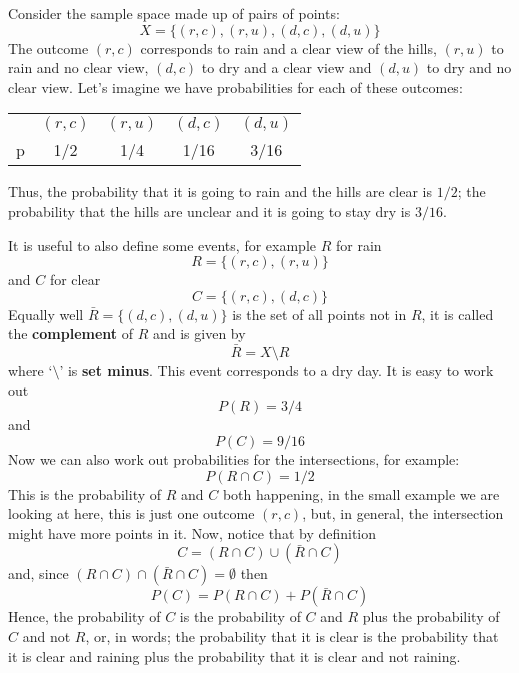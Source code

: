 \documentclass[11pt,a4paper]{scrartcl}
\begin{document}
Consider the sample space made up of pairs of points:
\begin{equation}
X=\{(r,c),(r,u),(d,c),(d,u)\}
\end{equation}
The outcome $(r,c)$ corresponds to rain and a clear view of the hills,
$(r,u)$ to rain and no clear view, $(d,c)$ to dry and a clear view and
$(d,u)$ to dry and no clear view. Let's imagine we have probabilities
for each of these outcomes:
\begin{center}
\begin{tabular}{c|cccc}
&$(r,c)$&$(r,u)$&$(d,c)$&$(d,u)$\\
p&1/2&1/4&1/16&3/16
\end{tabular}
\end{center}
Thus, the probability that it is going to rain and the hills are clear
is $1/2$; the probability that the hills are unclear and it is going
to stay dry is $3/16$. 

It is useful to also define some events, for example $R$ for rain
\begin{equation}
R=\{(r,c),(r,u)\}
\end{equation}
and $C$ for clear
\begin{equation}
C=\{(r,c),(d,c)\}
\end{equation}
Equally well $\bar{R}=\{(d,c),(d,u)\}$ is the set of all points not in $R$, it is called the \textbf{complement} of $R$ and is given by
\begin{equation}
\bar{R}=X\setminus R
\end{equation}
where \lq{}$\setminus$\rq{} is \textbf{set minus}. This event
corresponds to a dry day. It is easy to work out
\begin{equation}
P(R)=3/4
\end{equation}
and 
\begin{equation}
P(C)=9/16
\end{equation}
Now we can also work out probabilities for the intersections, for example:
\begin{equation}
P(R\cap C)=1/2
\end{equation}
This is the probability of $R$ and $C$ both happening, in the small
example we are looking at here, this is just one outcome $(r,c)$, but,
in general, the intersection might have more points in it. Now, notice
that by definition
\begin{equation}
C=(R\cap C)\cup (\bar{R}\cap C)
\end{equation}
and, since $(R\cap C)\cap (\bar{R}\cap C)=\emptyset$ then
\begin{equation}
P(C)=P(R\cap C)+P(\bar{R}\cap C)
\end{equation}
Hence, the probability of $C$ is the probability of $C$ and $R$ plus
the probability of $C$ and not $R$, or, in words; the probability that
it is clear is the probability that it is clear and raining plus the
probability that it is clear and not raining.
\end{document}
